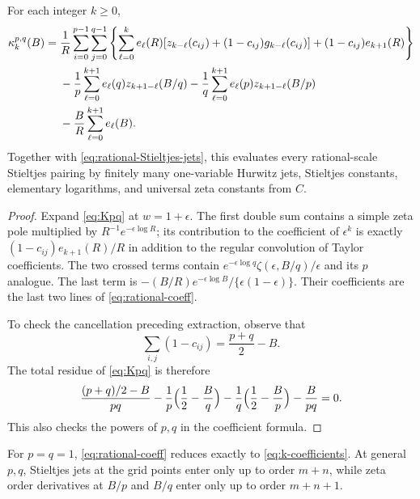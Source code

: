 \begin{corollary}\label{thm:rational-coeff}
For each integer $k\ge0$,
\begin{align}
 \kappa_k^{p,q}(B)={}&\frac1R\sum_{i=0}^{p-1}\sum_{j=0}^{q-1}
  \left\{\sum_{\ell=0}^{k}e_\ell(R)
       [z_{k-\ell}(c_{ij})+(1-c_{ij})g_{k-\ell}(c_{ij})]
      +(1-c_{ij})e_{k+1}(R)\right\}\notag\\
 &-\frac1p\sum_{\ell=0}^{k+1}e_\ell(q)z_{k+1-\ell}(B/q)
  -\frac1q\sum_{\ell=0}^{k+1}e_\ell(p)z_{k+1-\ell}(B/p)\notag\\
 &-\frac BR\sum_{\ell=0}^{k+1}e_\ell(B).
                                  \label{eq:rational-coeff}
\end{align}
Together with \eqref{eq:rational-Stieltjes-jets}, this evaluates every
rational-scale Stieltjes pairing by finitely many one-variable Hurwitz
jets, Stieltjes constants, elementary logarithms, and universal zeta
constants from $C$.
\end{corollary}
\begin{proof}
Expand \eqref{eq:Kpq} at $w=1+\epsilon$.
The first double sum contains a simple zeta pole multiplied by
$R^{-1}e^{-\epsilon\log R}$; its contribution to the coefficient of
$\epsilon^k$ is exactly $(1-c_{ij})e_{k+1}(R)/R$ in addition to the
regular convolution of Taylor coefficients. The two crossed terms
contain $e^{-\epsilon\log q}\zeta(\epsilon,B/q)/\epsilon$ and its
$p$ analogue. The last term is
$-(B/R)e^{-\epsilon\log B}/\{\epsilon(1-\epsilon)\}$.
Their coefficients are the last two lines of \eqref{eq:rational-coeff}.

To check the cancellation preceding extraction, observe that
\[
 \sum_{i,j}(1-c_{ij})=\frac{p+q}{2}-B.
\]
The total residue of \eqref{eq:Kpq} is therefore
\[
 \frac{(p+q)/2-B}{pq}
 -\frac1p\Bigl(\frac12-\frac Bq\Bigr)
 -\frac1q\Bigl(\frac12-\frac Bp\Bigr)-\frac B{pq}=0.
\]
This also checks the powers of $p,q$ in the coefficient formula.
\end{proof}

For $p=q=1$, \eqref{eq:rational-coeff} reduces exactly to
\eqref{eq:k-coefficients}. At general $p,q$, Stieltjes jets at the grid
points enter only up to order $m+n$, while zeta order derivatives at
$B/p$ and $B/q$ enter only up to order $m+n+1$.

